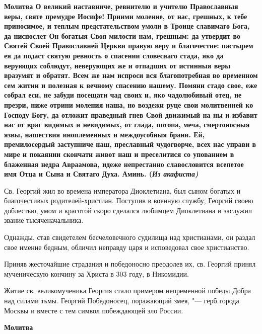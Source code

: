 \medskip
\bfseries Молитва\normalfont{}
О великий наставниче, ревнителю и учителю Православныя веры, святе премудре Иосифе! Приими моление, от нас, грешных, к тебе приносимое, и теплым предстательством умоли в Троице славимаго Бога, да ниспослет Он богатыя Своя милости нам, грешным: да утвердит во Святей Своей Православней Церкви правую веру и благочестие: пастырем ея да подаст святую ревность о спасении словеснаго стада, яко да верующих соблюдут, неверующих же и отпадших от истинныя веры вразумят и обратят. Всем же нам испроси вся благопотребная во временном сем житии и полезная к вечному спасению нашему. Помяни стадо свое, еже собрал еси, не забуди посещати чад своих и, яко чадолюбивый отец, не презри, ниже отрини моления наша, но воздежи руце свои молитвенней ко Господу Богу, да отложит праведный гнев Свой движимый на ны и избавит нас от враг видимых и невидимых, от глада, потопа, меча, смертоносныя язвы, нашествия иноплеменных и междоусобныя брани. Ей, премилосердый заступниче наш, преславный чудогворче, всех нас управи в мире и покаянии скончати живот наш и преселитися со упованием в блаженная недра Авраамова, идеже непрестанно славословится всепетое имя Отца и Сына и Святаго Духа. Аминь. (\itshape Из акафиста\normalfont{})

\bigskip\bigskip\mychapterending

 

Св. Георгий жил во времена императора Диоклетиана, был сыном богатых и благочестивых родителей-христиан. Поступив в военную службу, Георгий своею доблестью, умом и красотой скоро сделался любимцем Диоклетиана и заслужил звание тысяченачальника. 

Однажды, став свидетелем бесчеловечного судилища над христианами, он раздал свое имение бедным, обличил неправду царя и исповедовал свое христианство. 

Приняв жесточайшие страдания и победоносно преодолев их, св. Георгий принял мученическую кончину за Христа в 303 году, в Никомидии. 

Житие св. великомученика Георгия стало примером непременной победы Добра над силами тьмы. Георгий Победоносец, поражающий змея, "--- герб города Москвы и вместе с тем символ побеждающей зло России.


\medskip


\bfseries Молитва\normalfont{}

